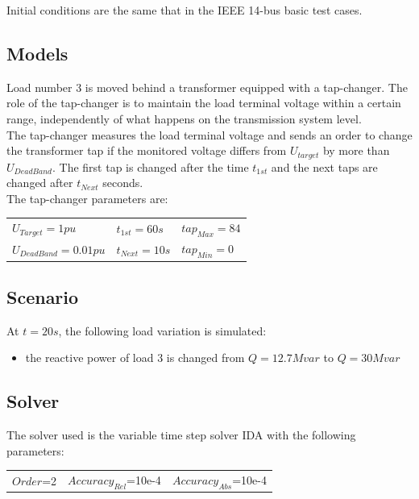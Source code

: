 \documentclass[a4paper, 12pt]{report}
\begin{document}
Initial conditions are the same that in the IEEE 14-bus basic test cases.

\subsection{Models}

Load number 3 is moved behind a transformer equipped with a tap-changer. The role of the tap-changer is to maintain the load terminal voltage within a certain range, independently of what happens on the transmission system level. \\

The tap-changer measures the load terminal voltage and sends an order to change the transformer tap if the monitored voltage differs from $U_{target}$ by more than $U_{DeadBand}$. The first tap is changed after the time $t_{1st}$ and the next taps are changed after $t_{Next}$ seconds.\\

The tap-changer parameters are:
\begin{center}
\begin{tabular}{l|l|l}
   $U_{Target}=1pu$ & $t_{1st}=60s$ & $tap_{Max}=84$ \\
   $U_{DeadBand}=0.01pu$  & $t_{Next}=10s$ & $tap_{Min}=0$ \\
\end{tabular}
\end{center}

\subsection{Scenario}
At $t=20s$, the following load variation is simulated:
\begin{itemize}
\item{the reactive power of load 3 is changed from $Q=12.7Mvar$ to $Q=30Mvar$}
\end{itemize}

\subsection{Solver}
The solver used is the variable time step solver IDA with the following parameters:
\begin{center}
\begin{tabular}{l|l|l}
   $Order$=2 & $Accuracy_{Rel}$=10e-4 & $Accuracy_{Abs}$=10e-4 \\
\end{tabular}
\end{center}
\end{document}
